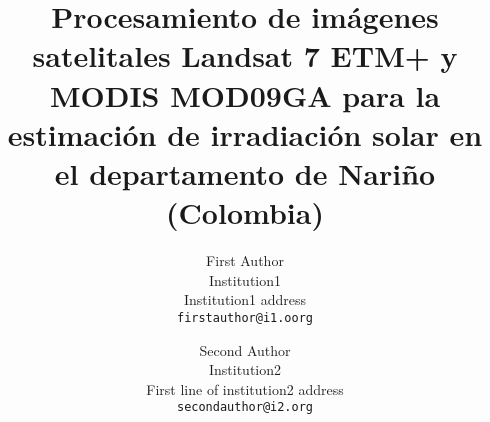 \documentclass[10pt,twocolumn,letterpaper]{article}
\begin{document}
\title{Procesamiento de imágenes satelitales Landsat 7 ETM+ y MODIS MOD09GA para la estimación de irradiación solar en el departamento de Nariño (Colombia)}

\author{First Author\\
Institution1\\
Institution1 address\\
{\tt\small firstauthor@i1.oorg}
\and
Second Author\\
Institution2\\
First line of institution2 address\\
{\tt\small secondauthor@i2.org}
}

\maketitle
\end{document}
